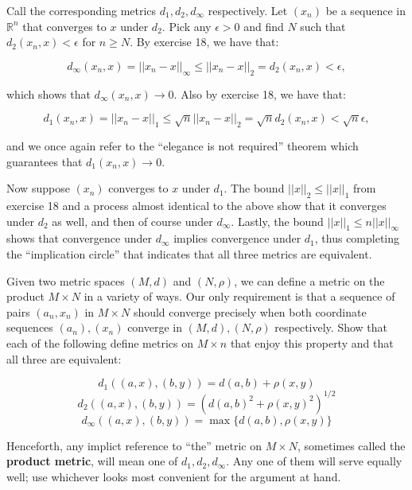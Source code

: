\begin{solution}
    
    Call the corresponding metrics $d_1, d_2, d_{\infty}$ respectively.
    Let $(x_n)$ be a sequence in $\mathbb{R}^n$ that converges to $x$ under $d_2$.
    Pick any $\epsilon > 0$ and find $N$ such that $d_2(x_n, x) < \epsilon$ for $n \geq N$.
    By exercise 18, we have that:

    $$d_{\infty}(x_n, x) = \lvert \lvert x_n - x \rvert \rvert_{\infty} \leq \lvert \lvert x_n - x \rvert \rvert_2 = d_2(x_n, x) < \epsilon,$$

    which shows that $d_{\infty}(x_n, x) \rightarrow 0$.
    Also by exercise 18, we have that:

    $$d_1(x_n, x) = \lvert \lvert x_n - x \rvert \rvert_1 \leq \sqrt{n} \lvert \lvert x_n - x \rvert \rvert_2 = \sqrt{n} d_2(x_n, x) < \sqrt{n} \epsilon,$$

    and we once again refer to the ``elegance is not required'' theorem which guarantees that $d_1(x_n, x) \rightarrow 0$.

    Now suppose $(x_n)$ converges to $x$ under $d_1$.
    The bound $\lvert \lvert x \rvert \rvert_2 \leq \lvert \lvert x \rvert \rvert_1$ from exercise 18 and a process almost identical to the above show that it converges under $d_2$ as well, and then of course under $d_{\infty}$.
    Lastly, the bound $\lvert \lvert x \rvert \rvert_1 \leq n \lvert \lvert x \rvert \rvert_{\infty}$ shows that convergence under $d_{\infty}$ implies convergence under $d_1$, thus completing the ``implication circle'' that indicates that all three metrics are equivalent.
\end{solution}

\begin{exercise}{46}
    Given two metric spaces $(M, d)$ and $(N, \rho)$, we can define a metric on the product $M \times N$ in a variety of ways.
    Our only requirement is that a sequence of pairs $(a_n, x_n)$ in $M \times N$ should converge precisely when both coordinate sequences $(a_n), (x_n)$ converge in $(M, d), (N, \rho)$ respectively.
    Show that each of the following define metrics on $M \times n$ that enjoy this property and that all three are equivalent:

    $$d_1((a, x), (b, y)) = d(a, b) + \rho(x, y)$$
    $$d_2((a, x), (b, y)) = (d(a, b)^2 + \rho(x, y)^2)^{1/2}$$
    $$d_{\infty}((a, x), (b, y)) = \max\{d(a, b), \rho(x, y)\}$$

    Henceforth, any implict reference to ``the'' metric on $M \times N$, sometimes called the \textbf{product metric}, will mean one of $d_1, d_2, d_{\infty}$.
    Any one of them will serve equally well; use whichever looks most convenient for the argument at hand.
\end{exercise}

